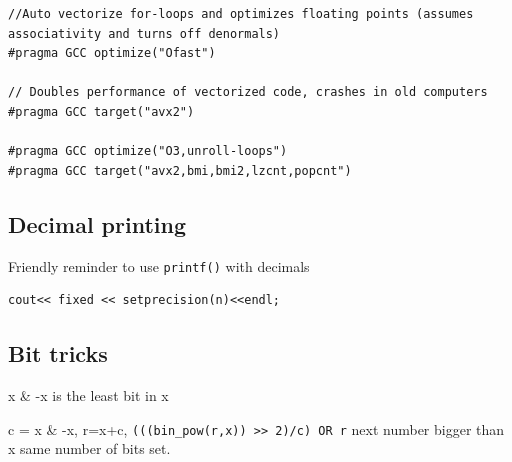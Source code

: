 \documentclass[10pt]{article}
\begin{document}
\begin{multicols*}{2}
\begin{lstlisting}[style=compactcpp]
//Auto vectorize for-loops and optimizes floating points (assumes associativity and turns off denormals)
#pragma GCC optimize("Ofast")

// Doubles performance of vectorized code, crashes in old computers
#pragma GCC target("avx2")

#pragma GCC optimize("O3,unroll-loops")
#pragma GCC target("avx2,bmi,bmi2,lzcnt,popcnt")
\end{lstlisting}

\subsection{Decimal printing}

Friendly reminder to use \texttt{printf()} with decimals

\begin{lstlisting}[style=compactcpp]
cout<< fixed << setprecision(n)<<endl;
\end{lstlisting}

\subsection{Bit tricks}

x \& -x is the least bit in x

c = x \& -x, r=x+c, \texttt{(((bin\_pow(r,x)) >> 2)/c) OR r}  next number bigger than x same number of bits set.

\end{multicols*}
\end{document}
